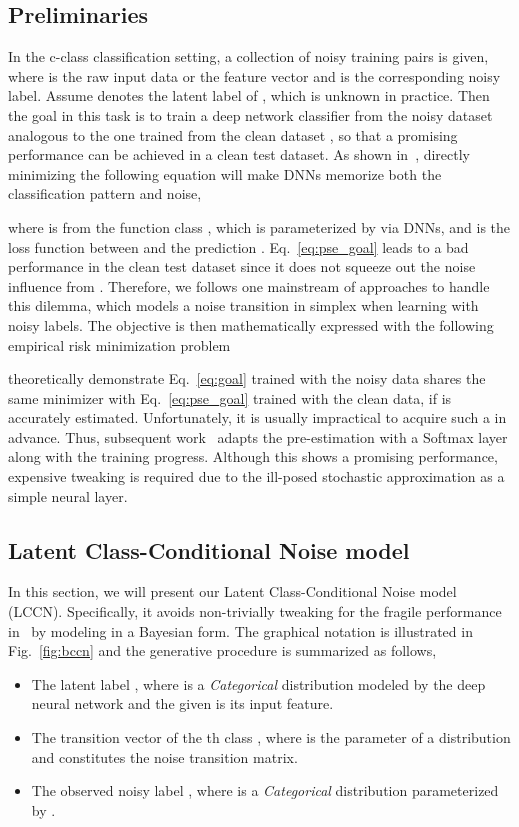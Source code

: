 \documentclass[journal]{IEEEtran}
\begin{document}
\subsection{Preliminaries}
In the c-class classification setting, a collection of  noisy training pairs  is given, where  is the raw input data or the feature vector and  is the corresponding noisy label. Assume  denotes the latent label of , which is unknown in practice. Then the goal in this task is to train a deep network classifier from the noisy dataset  analogous to the one trained from the clean dataset , so that a promising performance can be achieved in a clean test dataset.  As shown in~\cite{zhang2016understanding}, directly minimizing the following equation will make DNNs memorize both the classification pattern and noise,

where  is from the function class , which is parameterized by  via DNNs, and  is the loss function between  and the prediction . Eq.~\eqref{eq:pse_goal} leads to a bad performance in the clean test dataset since it does not squeeze out the noise influence from . Therefore, we follows one mainstream of approaches to handle this dilemma, which models a noise transition  in simplex  when learning with noisy labels. The objective is then mathematically expressed with the following empirical risk minimization problem

\citet{patrini2017making} theoretically demonstrate Eq.~\eqref{eq:goal} trained with the noisy data shares the same minimizer with Eq.~\eqref{eq:pse_goal} trained with the clean data, if  is accurately estimated. Unfortunately, it is usually impractical to acquire such a  in advance. Thus, subsequent work~\cite{goldberger2016training} adapts the pre-estimation with a Softmax layer along with the training progress. Although this shows a promising performance, expensive tweaking is required due to the ill-posed stochastic approximation as a simple neural layer.

\subsection{Latent Class-Conditional Noise model}
In this section, we will present our Latent Class-Conditional Noise model (LCCN). Specifically, it avoids non-trivially tweaking for the fragile performance in~\cite{goldberger2016training} by modeling  in a Bayesian form. The graphical notation is illustrated in Fig.~\ref{fig:bccn} and the generative procedure is summarized as follows,
\begin{itemize}
\item The latent label , where  is a \emph{Categorical} distribution modeled by the deep neural network  and the given  is its input feature.
\item The transition vector of the th class , where  is the parameter of a  distribution and  constitutes the noise transition matrix.
\item The observed noisy label , where  is a \emph{Categorical} distribution parameterized by .
\end{itemize}
\end{document}
